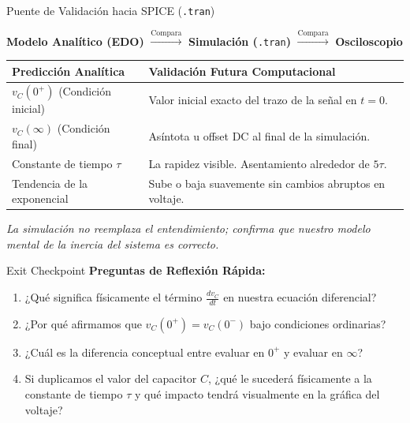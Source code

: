 \documentclass[aspectratio=169, 10pt]{beamer}
\begin{document}
\begin{frame}{Puente de Validación hacia SPICE (\texttt{.tran})}
    \begin{center}
        \textbf{Modelo Analítico (EDO)} $\xrightarrow{\text{Compara}}$ \textbf{Simulación (}\texttt{.tran}\textbf{)} $\xrightarrow{\text{Compara}}$ \textbf{Osciloscopio}
    \end{center}
    
    \vspace{0.4cm}
    \renewcommand{\arraystretch}{1.5}
    \begin{tabular}{p{4.5cm} p{8cm}}
    \toprule
    \textbf{Predicción Analítica} & \textbf{Validación Futura Computacional} \\ 
    \midrule
    $v_C(0^+)$ (Condición inicial) & Valor inicial exacto del trazo de la señal en $t=0$. \\ 
    $v_C(\infty)$ (Condición final) & Asíntota u offset DC al final de la simulación. \\ 
    Constante de tiempo $\tau$ & La rapidez visible. Asentamiento alrededor de $5\tau$. \\ 
    Tendencia de la exponencial & Sube o baja suavemente sin cambios abruptos en voltaje. \\ 
    \bottomrule
    \end{tabular}
    
    \vspace{0.4cm}
    \textit{La simulación no reemplaza el entendimiento; confirma que nuestro modelo mental de la inercia del sistema es correcto.}
\end{frame}

\begin{frame}{Exit Checkpoint}
    \textbf{Preguntas de Reflexión Rápida:}
    \vspace{0.3cm}
    \begin{enumerate}
        \item ¿Qué significa físicamente el término $\frac{dv_C}{dt}$ en nuestra ecuación diferencial?
        \item ¿Por qué afirmamos que $v_C(0^+) = v_C(0^-)$ bajo condiciones ordinarias?
        \item ¿Cuál es la diferencia conceptual entre evaluar en $0^+$ y evaluar en $\infty$?
        \item Si duplicamos el valor del capacitor $C$, ¿qué le sucederá físicamente a la constante de tiempo $\tau$ y qué impacto tendrá visualmente en la gráfica del voltaje?
    \end{enumerate}
\end{frame}
\end{document}
